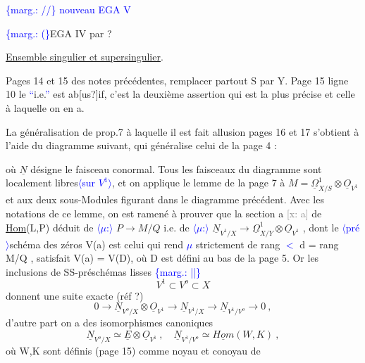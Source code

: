 \documentclass[11pt]{article}
\newcommand{\scanpage}[1]{\par\bigskip\noindent{\small\sffamily[scan #1]}\par}
\newcommand{\mspage}[1]{{\small\sffamily[p.\,#1]}}
\newcommand{\hand}[1]{\textcolor{blue}{#1}}
\let\over\relax
\newcommand{\over}[2]{\textcolor{gray}{#1}\textcolor{blue}{\ensuremath{^{\!\nearrow}}#2}}
\newcommand{\inserted}[2][]{\textcolor{blue}{$\langle$#2$\rangle$}}
\newcommand{\margin}[1]{\textcolor{blue}{\{\textsf{marg.:} #1\}}}
\newcommand{\xout}[1]{\textcolor{gray}{[\textsf{x:} #1]}}
\newcommand{\uline}[1]{\underline{#1}}
\newcommand{\unsure}[1]{[#1?]}
\newenvironment{diagramblock}{\par\begin{center}}{\end{center}\par}
\begin{document}
\mspage{\hand{165}}

\clearpage
\scanpage{25/166}
\margin{//} \hand{nouveau EGA V} \mspage{1}

\margin{(}EGA IV par ?

\uline{Ensemble singulier et supersingulier}.

Pages 14 et 15 des notes précédentes, remplacer partout S par Y. Page
15 ligne 10 le \hand{``}i.e.\hand{''} est ab\unsure{us}if, c'est la deuxième assertion qui est la
plus précise et celle à laquelle on en a.

La généralisation de prop.7 à laquelle il est fait allusion pages 16
et 17 s'obtient à l'aide du diagramme suivant, qui généralise celui de la
page 4 :
\begin{diagramblock}\end{diagramblock}

où $\underline{N}$ désigne le faisceau conormal. Tous les faisceaux du diagramme sont
localement libres\inserted{sur $V^1$}, et on applique le lemme de la page 7 à $M=\underline{\Omega}^1_{X/S}\otimes\underline{O}_{V^1}$
et aux deux sous-Modules figurant dans le diagramme précédent. Avec
les notations de ce lemme, on est ramené à prouver que la section a
\xout{a} de \uline{Hom}(L,P) déduit de \inserted{$\mu$:} $P\rightarrow M/Q$ i.e. de \inserted{$\mu$:} $\underline{N}_{V^1/X}\longrightarrow\underline{\Omega}^1_{X/Y}\otimes\underline{O}_{V^1}$ ,
dont le \inserted{pré}schéma des zéros V(a) est celui qui rend \hand{$\mu$} strictement de rang
\hand{$<$} d = rang M/Q , satisfait V(a) = V(D), où D est défini au bas de la
page \over{\unsure{1}}{1}5. Or les inclusions de SS-préschémas lisses
\margin{||}
\[ V^1 \subset V^o \subset X \]
donnent une suite exacte (réf ?)
\[ 0 \rightarrow \underline{N}_{V^o/X}\otimes\underline{O}_{V^1} \rightarrow \underline{N}_{V^1/X} \longrightarrow \underline{N}_{V^1/V^o} \rightarrow 0 \ , \]
d'autre part on a des isomorphismes canoniques
\[ \underline{N}_{V^o/X} \simeq \underline{E}\otimes\underline{O}_{V^1} \ , \quad \underline{N}_{V^1/V^o} \simeq \uline{Hom}(W,K) \ , \]
où W,K sont définis (page 15) comme noyau et conoyau de
\end{document}
